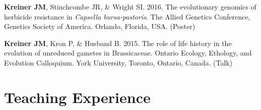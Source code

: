 \documentclass[12pt]{article}
\begin{document}



 \textbf{Kreiner JM}, Stinchcombe JR, \& Wright SI. 2016. The evolutionary genomics of herbicide resistance in \textit{Capsella bursa-pastoris}. The Allied Genetics Conference, Genetics Society of America. Orlando, Florida, USA. (Poster)


 \textbf{Kreiner JM}, Kron P, \& Husband B. 2015. The role of life history in the evolution of unreduced gametes in Brassicaceae. Ontario Ecology, Ethology, and Evolution Colloquium. York University, Toronto, Ontario, Canada. (Talk)


\section*{Teaching Experience}
\end{document}
